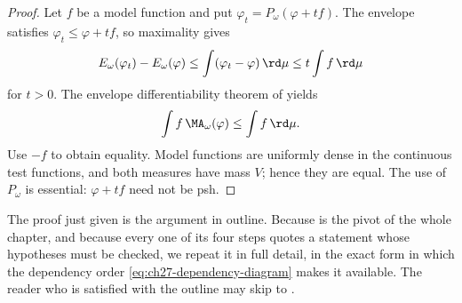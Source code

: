 \begin{proof}
Let $f$ be a model function and put
$\varphi_t=P_\omega(\varphi+tf)$.  The envelope satisfies
$\varphi_t\leq\varphi+tf$, so maximality gives
\[
 E_\omega(\varphi_t)-E_\omega(\varphi)
 \leq\int(\varphi_t-\varphi)\,\rd \mu
 \leq t\int f\,\rd \mu
\]
for $t>0$.  The envelope differentiability theorem of
 yields
\[
                    \int f\,\MA_\omega(\varphi)
                    \leq\int f\,\rd \mu.
\]
Use $-f$ to obtain equality.  Model functions are uniformly dense in the
continuous test functions, and both measures have mass $V$; hence they
are equal.  The use of $P_\omega$ is essential: $\varphi+tf$ need not
be psh.
\end{proof}

The proof just given is the argument in outline.  Because
 is the pivot of the whole chapter,
and because every one of its four steps quotes a statement whose hypotheses
must be checked, we repeat it in full detail, in the exact form in which the
dependency order \eqref{eq:ch27-dependency-diagram} makes it available.  The
reader who is satisfied with the outline may skip to
.

